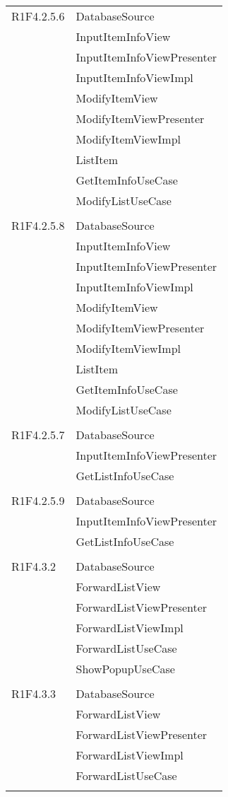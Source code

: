 \begin{center}
\begin{longtable}{|p{7cm}|p{7cm}|}
		R1F4.2.5.6 & DatabaseSource \\ & InputItemInfoView \\ & InputItemInfoViewPresenter \\ & InputItemInfoViewImpl \\ & ModifyItemView \\ & ModifyItemViewPresenter \\ & ModifyItemViewImpl \\ & ListItem \\ & GetItemInfoUseCase \\ & ModifyListUseCase \\ & \\ \hline
		R1F4.2.5.8 & DatabaseSource \\ & InputItemInfoView \\ & InputItemInfoViewPresenter \\ & InputItemInfoViewImpl \\ & ModifyItemView \\ & ModifyItemViewPresenter \\ & ModifyItemViewImpl \\ & ListItem \\ & GetItemInfoUseCase \\ & ModifyListUseCase \\ & \\ \hline
		R1F4.2.5.7 & DatabaseSource \\ & InputItemInfoViewPresenter \\ & GetListInfoUseCase \\ & \\ \hline
		R1F4.2.5.9 & DatabaseSource \\ & InputItemInfoViewPresenter \\ & GetListInfoUseCase \\ & \\ \hline
		R1F4.3.2 & DatabaseSource \\ & ForwardListView \\ & ForwardListViewPresenter \\ & ForwardListViewImpl \\ & ForwardListUseCase \\ & ShowPopupUseCase \\ & \\ \hline
		R1F4.3.3 & DatabaseSource \\ & ForwardListView \\ & ForwardListViewPresenter \\ & ForwardListViewImpl \\ & ForwardListUseCase \\ & \\ \hline

\end{longtable}
\end{center}
